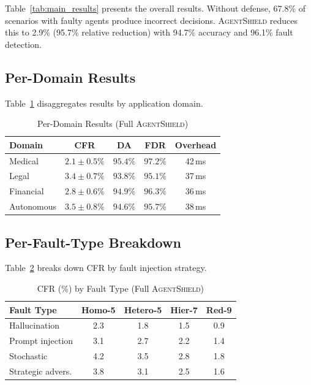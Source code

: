 \documentclass[journal,10pt]{IEEEtran}
\begin{document}
Table~\ref{tab:main_results} presents the overall results. Without defense, 67.8\% of scenarios with faulty agents produce incorrect decisions. \textsc{AgentShield} reduces this to 2.9\% (95.7\% relative reduction) with 94.7\% accuracy and 96.1\% fault detection.

\subsection{Per-Domain Results}
Table~\ref{tab:domain} disaggregates results by application domain.
\begin{table}[t]
\centering
\caption{Per-Domain Results (Full \textsc{AgentShield})}
\label{tab:domain}
\renewcommand{\arraystretch}{1.1}
\scriptsize
\begin{tabular}{@{}l c c c c@{}}
\toprule
\textbf{Domain} & \textbf{CFR} & \textbf{DA} & \textbf{FDR} & \textbf{Overhead} \\
\midrule
Medical & $2.1 \pm 0.5\%$ & $95.4\%$ & $97.2\%$ & 42\,ms \\
Legal & $3.4 \pm 0.7\%$ & $93.8\%$ & $95.1\%$ & 37\,ms \\
Financial & $2.8 \pm 0.6\%$ & $94.9\%$ & $96.3\%$ & 36\,ms \\
Autonomous & $3.5 \pm 0.8\%$ & $94.6\%$ & $95.7\%$ & 38\,ms \\
\bottomrule
\end{tabular}
\end{table}

\subsection{Per-Fault-Type Breakdown}
Table~\ref{tab:fault} breaks down CFR by fault injection strategy.
\begin{table}[t]
\centering
\caption{CFR (\%) by Fault Type (Full \textsc{AgentShield})}
\label{tab:fault}
\renewcommand{\arraystretch}{1.1}
\scriptsize
\begin{tabular}{@{}l c c c c@{}}
\toprule
\textbf{Fault Type} & \textbf{Homo-5} & \textbf{Hetero-5} & \textbf{Hier-7} & \textbf{Red-9} \\
\midrule
Hallucination & 2.3 & 1.8 & 1.5 & 0.9 \\
Prompt injection & 3.1 & 2.7 & 2.2 & 1.4 \\
Stochastic & 4.2 & 3.5 & 2.8 & 1.8 \\
Strategic advers. & 3.8 & 3.1 & 2.5 & 1.6 \\
\bottomrule
\end{tabular}
\end{table}
\end{document}

